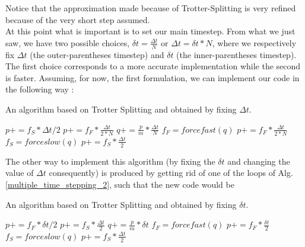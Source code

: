 Notice that the approximation made because of Trotter-Splitting is very refined because of the very short step assumed.\\
At this point what is important is to set our main timestep. From what we just saw, we have two possible choices, $\delta t = \frac{\Delta t}{N}$ or $\Delta t = \delta t *N$, where we respectively fix $\Delta t$ (the outer-parentheses timestep) and $\delta t$ (the inner-parentheses timestep). The first choice corresponds to a more accurate implementation while the second is faster. Assuming, for now, the first formulation, we can implement our code in the following way :
\begin{algorithm}[H]
            \caption{An algorithm based on Trotter Splitting and obtained by fixing $\Delta t$.}
            \label{multiple_time_stepping_2}
			\begin{algorithmic}[1]
				\State $p+=f_S*\Delta t/2$
				    \State$p+=f_F*\frac{\Delta t}{2*N}$
				    \State$q+=\frac{p}{m}*\frac{\Delta t}{N}$
				    \State$f_F=forcefast(q)$
				    \State$p+=f_F*\frac{\Delta t}{2*N}$
				\EndFor
				\State $f_S=forceslow(q)$
				\State $p+= f_S * \frac{\Delta t}{2}$
				\EndFor
			\end{algorithmic}
\end{algorithm}
The other way to implement this algorithm (by fixing the $\delta t$ and changing the value of $\Delta t$ consequently) is produced by getting rid of one of the loops of Alg.\ref{multiple_time_stepping_2}, such that the new code would be
\begin{algorithm}[H]
            \caption{An algorithm based on Trotter Splitting and obtained by fixing $\delta t$.}
            \label{multiple_time_stepping_3}
			\begin{algorithmic}[1]
				\State $p+=f_F*\delta t/2$
			    \State $p+= f_S*\frac{\Delta t}{2}$
			    \EndIf
			    \State$q+=\frac{p}{m}*\delta t$
			    \State$f_F=forcefast(q)$
			    \State$p+=f_F*\frac{\delta t}{2}$
			    \State$f_S=forceslow(q)$
			    \State$p+=f_S*\frac{\Delta t}{2}$
			    \EndIf
				\EndFor
			\end{algorithmic}
\end{algorithm}
